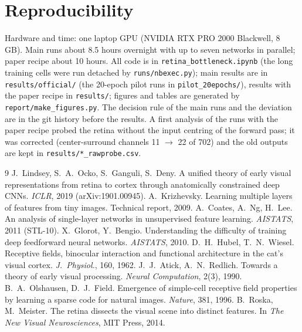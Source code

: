 \documentclass[11pt,a4paper]{article}
\begin{document}
\appendix
\section{Reproducibility}
\begin{sloppypar}
Hardware and time: one laptop GPU (NVIDIA RTX PRO 2000 Blackwell, 8 GB). Main runs about 8.5 hours overnight with up to seven networks in parallel; paper recipe about 10 hours. All code is in \texttt{retina\_bottleneck.ipynb} (the long training cells were run detached by \texttt{runs/nbexec.py}); main results are in \texttt{results/official/} (the 20-epoch pilot runs in \texttt{pilot\_20epochs/}), results with the paper recipe in \texttt{results/}; figures and tables are generated by \texttt{report/make\_figures.py}. The decision rule of the main runs and the deviation are in the git history before the results. A first analysis of the runs with the paper recipe probed the retina without the input centring of the forward pass; it was corrected (center-surround channels 11 $\to$ 22 of 702) and the old outputs are kept in \texttt{results/*\_rawprobe.csv}.
\end{sloppypar}

\begin{thebibliography}{9}\small
{} J.~Lindsey, S.~A.~Ocko, S.~Ganguli, S.~Deny. A unified theory of early visual representations from retina to cortex through anatomically constrained deep CNNs. \emph{ICLR}, 2019 (arXiv:1901.00945).
 A.~Krizhevsky. Learning multiple layers of features from tiny images. Technical report, 2009.
 A.~Coates, A.~Ng, H.~Lee. An analysis of single-layer networks in unsupervised feature learning. \emph{AISTATS}, 2011 (STL-10).
 X.~Glorot, Y.~Bengio. Understanding the difficulty of training deep feedforward neural networks. \emph{AISTATS}, 2010.
 D.~H.~Hubel, T.~N.~Wiesel. Receptive fields, binocular interaction and functional architecture in the cat's visual cortex. \emph{J.\ Physiol.}, 160, 1962.
 J.~J.~Atick, A.~N.~Redlich. Towards a theory of early visual processing. \emph{Neural Computation}, 2(3), 1990.
 B.~A.~Olshausen, D.~J.~Field. Emergence of simple-cell receptive field properties by learning a sparse code for natural images. \emph{Nature}, 381, 1996.
 B.~Roska, M.~Meister. The retina dissects the visual scene into distinct features. In \emph{The New Visual Neurosciences}, MIT Press, 2014.
\end{thebibliography}
\end{document}
